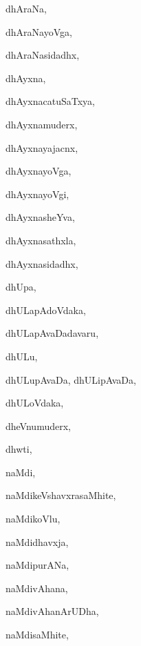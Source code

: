 \begin{multicols}{3}
{\noindent
{dhAraNa}, \pageref{dhAraNa}

\noindent
{dhAraNayoVga}, \pageref{dhAraNayoVga}

\noindent
{dhAraNasidadhx}, \pageref{dhAraNasidadhx}

\noindent
{dhAyxna}, \pageref{dhAyxna}

\noindent
{dhAyxnacatuSaTxya}, \pageref{dhAyxnacatuSaTxya}

\noindent
{dhAyxnamuderx}, \pageref{dhAyxnamuderx}

\noindent
{dhAyxnayajacnx}, \pageref{dhAyxnayajacnx}

\noindent
{dhAyxnayoVga}, \pageref{dhAyxnayoVga}

\noindent
{dhAyxnayoVgi}, \pageref{dhAyxnayoVgi}

\noindent
{dhAyxnasheYva}, \pageref{dhAyxnasheYva}

\noindent
{dhAyxnasathxla}, \pageref{dhAyxnasathxla}

\noindent
{dhAyxnasidadhx}, \pageref{dhAyxnasidadhx}

\noindent
{dhUpa}, \pageref{dhUpa}

\noindent
{dhULapAdoVdaka}, \pageref{dhULapAdoVdaka}

\noindent
{dhULapAvaDadavaru}, \pageref{dhULapAvaDadavaru}

\noindent
{dhULu}, \pageref{dhULu}

\noindent
{dhULupAvaDa, dhULipAvaDa}, \pageref{dhULupAvaDa, dhULipAvaDa}

\noindent
{dhULoVdaka}, \pageref{dhULoVdaka}

\noindent
{dheVnumuderx}, \pageref{dheVnumuderx}

\noindent
{dhwti}, \pageref{dhwti}

\bigskip
\noindent
{}
\smallskip

\noindent
{naMdi}, \pageref{naMdi}

\noindent
{naMdikeVshavxrasaMhite}, \pageref{naMdikeVshavxrasaMhite}

\noindent
{naMdikoVlu}, \pageref{naMdikoVlu}

\noindent
{naMdidhavxja}, \pageref{naMdidhavxja}

\noindent
{naMdipurANa}, \pageref{naMdipurANa}

\noindent
{naMdivAhana}, \pageref{naMdivAhana}

\noindent
{naMdivAhanArUDha}, \pageref{naMdivAhanArUDha}

\noindent
{naMdisaMhite}, \pageref{naMdisaMhite}

}
\end{multicols}
